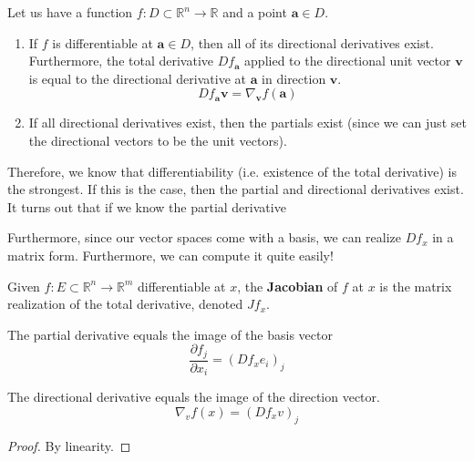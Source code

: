   \begin{theorem}
    Let us have a function $f: D \subset \mathbb{R}^n \longrightarrow \mathbb{R}$ and a point $\mathbf{a} \in D$. 
    \begin{enumerate}
      \item If $f$ is differentiable at $\mathbf{a} \in D$, then all of its directional derivatives exist. Furthermore, the total derivative $D f_\mathbf{a}$ applied to the directional unit vector $\mathbf{v}$ is equal to the directional derivative at $\mathbf{a}$ in direction $\mathbf{v}$.
      \begin{equation}
        D f_\mathbf{a} \mathbf{v} = \nabla_\mathbf{v} f (\mathbf{a})
      \end{equation}

      \item If all directional derivatives exist, then the partials exist (since we can just set the directional vectors to be the unit vectors). 
    \end{enumerate}
  \end{theorem} 

  Therefore, we know that differentiability (i.e. existence of the total derivative) is the strongest. If this is the case, then the partial and directional derivatives exist. It turns out that if we know the partial derivative 

  Furthermore, since our vector spaces come with a basis, we can realize $Df_x$ in a matrix form. Furthermore, we can compute it quite easily!

  \begin{definition}[Jacobian]
    Given $f: E \subset \mathbb{R}^n \to \mathbb{R}^m$ differentiable at $x$, the \textbf{Jacobian} of $f$ at $x$ is the matrix realization of the total derivative, denoted $J f_x$. 
  \end{definition} 

  \begin{theorem}
    The partial derivative equals the image of the basis vector 
    \begin{equation}
      \frac{\partial f_j}{\partial x_i} = (D f_x e_i)_j
    \end{equation}
  \end{theorem}
  
  \begin{corollary}
    The directional derivative equals the image of the direction vector. 
    \begin{equation}
      \nabla_v f(x) = (D f_x v)_j
    \end{equation}
  \end{corollary}
  \begin{proof}
    By linearity. 
  \end{proof}

